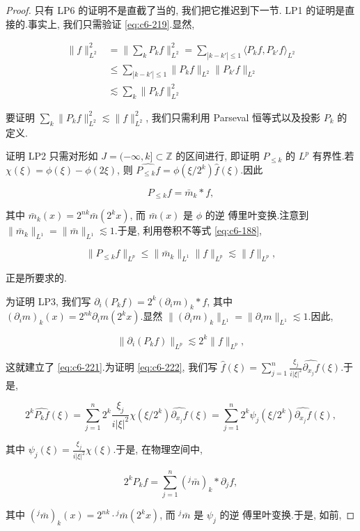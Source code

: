 \begin{proof}
只有 LP6 的证明不是直截了当的, 我们把它推迟到下一节. LP1 的证明是直接的.事实上, 我们只需验证 \eqref{eq:c6-219}.显然,

\[
\begin{aligned}
\|f\|_{L^2}^2 &= \|\sum_k P_k f\|_{L^2}^2 = \sum_{|k-k'|\leq 1} \langle P_k f, P_{k'} f\rangle_{L^2}\\
&\leq \sum_{|k-k'|\leq 1} \|P_k f\|_{L^2} \|P_{k'} f\|_{L^2}\\
&\lesssim \sum_k \|P_k f\|_{L^2}^2
\end{aligned}
\]

要证明 $\sum_k \|P_k f\|_{L^2}^2 \lesssim \|f\|_{L^2}^2$, 我们只需利用 Parseval 恒等式以及投影 $P_k$ 的定义.

证明 LP2 只需对形如 $J = (-\infty, k] \subset \mathbb{Z}$ 的区间进行, 即证明 $P_{\leq k}$ 的 $L^p$ 有界性.若 $\chi(\xi) = \phi(\xi) - \phi(2\xi)$, 则 $\widehat{P_{\leq k} f} = \phi(\xi/2^k)\hat{f}(\xi)$.因此

\[
P_{\leq k} f = \bar{m}_k * f,
\]

其中 $\bar{m}_k(x) = 2^{nk} \bar{m}(2^k x)$, 而 $\bar{m}(x)$ 是 $\phi$ 的逆 傅里叶变换.注意到 $\|\bar{m}_k\|_{L^1} = \|\bar{m}\|_{L^1} \lesssim 1$.于是, 利用卷积不等式 \eqref{eq:c6-188},

\[
\|P_{\leq k} f\|_{L^p} \leq \|\bar{m}_k\|_{L^1} \|f\|_{L^p} \lesssim \|f\|_{L^p},
\]

正是所要求的.

为证明 LP3, 我们写 $\partial_i(P_k f) = 2^k (\partial_i m)_k * f$, 其中 $(\partial_i m)_k(x) = 2^{nk} \partial_i m(2^k x)$.显然 $\|(\partial_i m)_k\|_{L^1} = \|\partial_i m\|_{L^1} \lesssim 1$.因此,

\[
\|\partial_i(P_k f)\|_{L^p} \lesssim 2^k \|f\|_{L^p},
\]

这就建立了 \eqref{eq:c6-221}.为证明 \eqref{eq:c6-222}, 我们写 $\hat{f}(\xi) = \sum_{j=1}^n \frac{\xi_j}{i|\xi|^2} \widehat{\partial_{x_j} f}(\xi)$.于是,

\[
2^k \widehat{P_k f}(\xi) = \sum_{j=1}^n 2^k \frac{\xi_j}{i|\xi|^2} \chi(\xi/2^k) \widehat{\partial_{x_j} f}(\xi) = \sum_{j=1}^n 2^k \psi_j(\xi/2^k) \widehat{\partial_{x_j} f}(\xi),
\]

其中 $\psi_j(\xi) = \frac{\xi_j}{i|\xi|^2} \chi(\xi)$.于是, 在物理空间中,

\[
2^k P_k f = \sum_{j=1}^n ({}^j\bar{m})_k * \partial_j f,
\]

其中 $({}^j\bar{m})_k(x) = 2^{nk} \cdot {}^j\bar{m}(2^k x)$, 而 ${}^j\bar{m}$ 是 $\psi_j$ 的逆 傅里叶变换.于是, 如前,


\end{proof}
